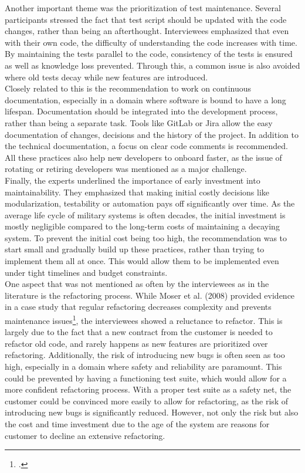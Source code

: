 Another important theme was the prioritization of test maintenance. Several participants stressed the fact that test script should be updated with the code changes, rather than being an afterthought.
Interviewees emphasized that even with their own code, the difficulty of understanding the code increases with time. By maintaining the tests parallel to the code, consistency of the tests is ensured as well as knowledge loss prevented.
Through this, a common issue is also avoided where old tests decay while new features are introduced.\\

Closely related to this is the recommendation to work on continuous documentation, especially in a domain where software is bound to have a long lifespan. Documentation should be integrated into the development process, rather than being a separate task.
Tools like GitLab or Jira allow the easy documentation of changes, decisions and the history of the project. In addition to the technical documentation, a focus on clear code comments is recommended.
All these practices also help new developers to onboard faster, as the issue of rotating or retiring developers was mentioned as a major challenge.\\

Finally, the experts underlined the importance of early investment into maintainability. They emphasized that making initial costly decisions like modularization, testability or automation pays off significantly over time.
As the average life cycle of military systems is often decades, the initial investment is mostly negligible compared to the long-term costs of maintaining a decaying system.
To prevent the initial cost being too high, the recommendation was to start small and gradually build up these practices, rather than trying to implement them all at once. This would allow them to be implemented even under tight timelines and budget constraints.\\

One aspect that was not mentioned as often by the interviewees as in the literature is the refactoring process. While Moser et al. (2008) provided evidence in a case study that regular refactoring decreases complexity and prevents maintenance issues\footcite[262]{moserCaseStudyImpact2008}, the interviewees showed a reluctance to refactor.
This is largely due to the fact that a new contract from the customer is needed to refactor old code, and rarely happens as new features are prioritized over refactoring. Additionally, the risk of introducing new bugs is often seen as too high, especially in a domain where safety and reliability are paramount.
This could be prevented by having a functioning test suite, which would allow for a more confident refactoring process. With a proper test suite as a safety net, the customer could be convinced more easily to allow for refactoring, as the risk of introducing new bugs is significantly reduced. However, not only the risk but also the cost and time investment due to the age of the system are reasons for customer to decline an extensive refactoring.\\

